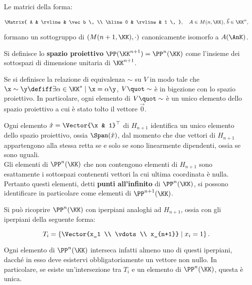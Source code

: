 \documentclass[11pt]{article}
\begin{document}
	\begin{remark}
		Le matrici della forma:
		
		\[ \Matrix{ A & \rvline & \vec b \, \\ \hline 0 & \rvline & 1 \, }, \quad A \in M(n, \KK), \, \vec b \in \KK^n, \]
		
		\vskip 0.05in
		
		formano un sottogruppo di $(M(n+1, \KK), \cdot)$ canonicamente isomorfo a $A(\AnK)$.
	\end{remark}
	
	\hr
	
	\begin{definition} 
		Si definisce lo \textbf{spazio proiettivo} $\PP(\KK^{n+1}) = \PP^n(\KK)$ come l'insieme
		dei sottospazi di dimensione unitaria di $\KK^{n+1}$.
	\end{definition}
	
	\begin{remark}
		Se si definisce la relazione di equivalenza $\sim$ su $V$ in modo tale che $\x \sim \y \defiff \exists \alpha \in \KK^* \mid \x = \alpha \y$, $V \quot \sim$ è in bigezione con lo spazio proiettivo. In particolare,
		ogni elemento di $V \quot \sim$ è un unico elemento dello spazio proiettivo a cui è stato tolto il vettore $\vec 0$.
	\end{remark}
	
	\begin{remark}
		Ogni elemento $\hat x = \Vector{\x & 1}^\top$ di $H_{n+1}$ identifica un unico elemento dello spazio proiettivo, ossia $\Span(\hat x)$, dal momento che due vettori di $H_{n+1}$ appartengono alla stessa retta se e solo se
		sono linearmente dipendenti, ossia se sono uguali. \\
		
		Gli elementi di $\PP^n(\KK)$ che non contengono elementi di $H_{n+1}$ sono esattamente i sottospazi
		contenenti vettori la cui ultima coordinata è nulla. Pertanto questi elementi, detti \textbf{punti all'infinito}
		di $\PP^n(\KK)$, si possono identificare in particolare come elementi di $\PP^{n+1}(\KK)$. \\
	\end{remark}
	
	\begin{remark}
		Si può ricoprire $\PP^n(\KK)$ con iperpiani analoghi ad $H_{n+1}$, ossia con gli iperpiani della
		seguente forma:
		
		\[ T_i = \left\{ \Vector{x_1 \\ \vdots \\ x_{n+1}} \;\middle\vert\; x_i = 1 \right\}. \]
		
		\vskip 0.1in
		
		Ogni elemento di $\PP^n(\KK)$ interseca infatti almeno uno di questi iperpiani, dacché in esso deve
		esistervi obbligatoriamente un vettore non nullo. In particolare, se esiste un'intersezione tra $T_i$
		e un elemento di $\PP^n(\KK)$, questa è unica.  
	\end{remark}
\end{document}
